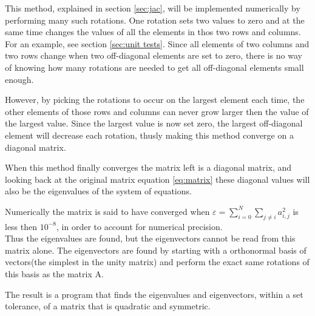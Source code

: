 \documentclass[11pt,a4paper,notitlepage]{article}
\begin{document}
This method, explained in section \ref{sec:jac}, will be implemented numerically by performing many such rotations. One rotation sets two values to zero and at the same time changes the values of all the elements in thos two rows and columns. For an example, see section \ref{sec:unit tests}. Since all elements of two columns and two rows change when two off-diagonal elements are set to zero, there is no way of knowing how many rotations are needed to get all off-diagonal elements small enough.

However, by picking the rotations to occur on the largest element each time,
the other elements of those rows and columns can never grow larger then the value of the largest value. Since the largest value is now set zero, the largest off-diagonal element will decrease each rotation, thusly making this method converge on a diagonal matrix. 

When this method finally converges the matrix left is a diagonal matrix, and looking back at the original matrix equation \eqref{eq:matrix} these diagonal values will also be the eigenvalues of the system of equations.

Numerically the matrix is said to have converged when $\varepsilon = \sum_{i=0}^N \sum_{j\neq i} a_{i,j}^2$ is less then $10^{-8}$, in order to account for numerical precision. \\

Thus the eigenvalues are found, but the eigenvectors cannot be read from this matrix alone. The eigenvectors are found by starting with a orthonormal basis of vectors(the simplest in the unity matrix) and perform the exact same rotations of this basis as the matrix A.

The result is a program that finds the eigenvalues and eigenvectors, within a set tolerance, of a matrix that is quadratic and symmetric.
\end{document}
